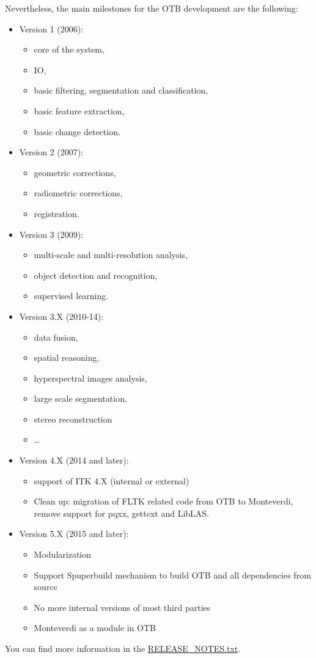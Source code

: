 Nevertheless, the main milestones for the OTB development are the
following:
\begin{itemize}
  \item{Version 1 (2006):}
  \begin{itemize}
    \item core of the system,
    \item IO,
    \item basic filtering, segmentation and classification,
    \item basic feature extraction,
    \item basic change detection.
  \end{itemize}
  \item{Version 2 (2007):}
  \begin{itemize}
    \item geometric corrections,
    \item radiometric corrections,
    \item registration.
  \end{itemize}
  \item{Version 3 (2009):}
  \begin{itemize}
    \item multi-scale and multi-resolution analysis,
    \item object detection and recognition,
    \item supervised learning.
  \end{itemize}
  \item{Version 3.X (2010-14):}
  \begin{itemize}
	  \item data fusion,
	  \item spatial reasoning,
    \item hyperspectral images analysis,
    \item large scale segmentation,
    \item stereo reconstruction
    \item \ldots
  \end{itemize}
  \item{Version 4.X (2014 and later):}
  \begin{itemize}
    \item support of ITK 4.X (internal or external)
    \item Clean up: migration of FLTK related code from OTB to
          Monteverdi, remove support for pqxx, gettext and LibLAS.
  \end{itemize}
  \item{Version 5.X (2015 and later):}
  \begin{itemize}
    \item Modularization
    \item Support Spuperbuild mechanism to build OTB and all dependencies
          from source
    \item No more internal versions of most third parties
    \item Monteverdi as a module in OTB
  \end{itemize}

\end{itemize}

You can find more information in the \href{https://git.orfeo-toolbox.org/otb.git/blob/HEAD:/RELEASE_NOTES.txt}{RELEASE\_NOTES.txt}.

